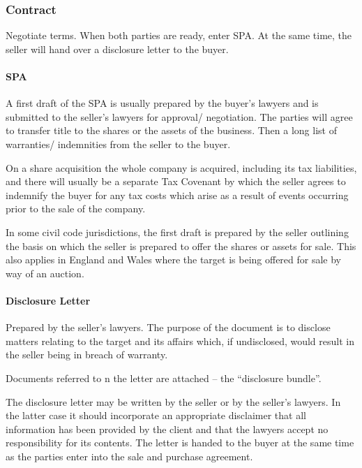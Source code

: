 \documentclass[
]{article}
\begin{document}
\hypertarget{contract}{%
\subsubsection{Contract}\label{contract}}

Negotiate terms. When both parties are ready, enter SPA. At the same
time, the seller will hand over a disclosure letter to the buyer.

\hypertarget{spa}{%
\paragraph{SPA}\label{spa}}

A first draft of the SPA is usually prepared by the buyer's lawyers and
is submitted to the seller's lawyers for approval/ negotiation. The
parties will agree to transfer title to the shares or the assets of the
business. Then a long list of warranties/ indemnities from the seller to
the buyer.

On a share acquisition the whole company is acquired, including its tax
liabilities, and there will usually be a separate Tax Covenant by which
the seller agrees to indemnify the buyer for any tax costs which arise
as a result of events occurring prior to the sale of the company.

In some civil code jurisdictions, the first draft is prepared by the
seller outlining the basis on which the seller is prepared to offer the
shares or assets for sale. This also applies in England and Wales where
the target is being offered for sale by way of an auction.

\hypertarget{disclosure-letter}{%
\paragraph{Disclosure Letter}\label{disclosure-letter}}

Prepared by the seller's lawyers. The purpose of the document is to
disclose matters relating to the target and its affairs which, if
undisclosed, would result in the seller being in breach of warranty.

Documents referred to n the letter are attached -- the ``disclosure
bundle''.

The disclosure letter may be written by the seller or by the seller's
lawyers. In the latter case it should incorporate an appropriate
disclaimer that all information has been provided by the client and that
the lawyers accept no responsibility for its contents. The letter is
handed to the buyer at the same time as the parties enter into the sale
and purchase agreement.
\end{document}

